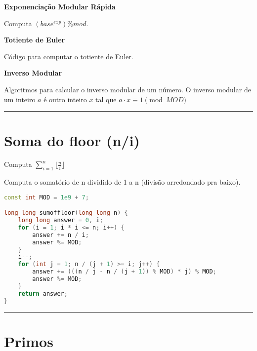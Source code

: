 \documentclass[11pt, a4paper, twoside]{book}
\begin{document}
\textbf{Exponenciação Modular Rápida} 



Computa $(base^{exp}) \% mod$.





\textbf{Totiente de Euler} 



Código para computar o totiente de Euler.





\textbf{Inverso Modular} 



Algoritmos para calcular o inverso modular de um número. O inverso modular de um inteiro $a$ é outro inteiro $x$ tal que $a \cdot x \equiv 1 \pmod{MOD}$






\hfill

\rule{\textwidth}{0.4pt}

\section{Soma do floor (n/i)}



Computa $\sum_{i=1}^{n} \lfloor\frac{n}{i}\rfloor $



Computa o somatório de n dividido de 1 a n (divisão arredondado pra baixo).




\hfill

\begin{lstlisting}[language=C++]
const int MOD = 1e9 + 7;

long long sumoffloor(long long n) {
    long long answer = 0, i;
    for (i = 1; i * i <= n; i++) {
        answer += n / i;
        answer %= MOD;
    }
    i--;
    for (int j = 1; n / (j + 1) >= i; j++) {
        answer += (((n / j - n / (j + 1)) % MOD) * j) % MOD;
        answer %= MOD;
    }
    return answer;
}
\end{lstlisting}

\hfill

\rule{\textwidth}{0.4pt}

\section{Primos}
\end{document}
